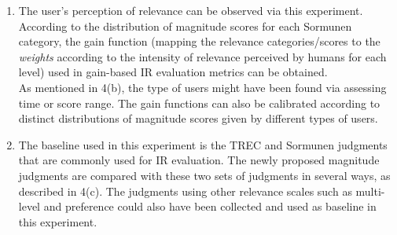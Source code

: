 \documentclass{article}
\begin{document}
\begin{enumerate}
\begin{enumerate}
	\item {The user's perception of relevance can be observed via this experiment. According to the distribution of magnitude scores for each Sormunen category, the gain function (mapping the relevance categories/scores to the \textit{weights} according to the intensity of relevance perceived by humans for each level) used in gain-based IR evaluation metrics can be obtained.\\[0.5em] As mentioned in 4(b), the type of users might have been found via assessing time or score range. The gain functions can also be calibrated according to distinct distributions of magnitude scores given by different types of users.}

	\item The baseline used in this experiment is the TREC and Sormunen judgments that are commonly used for IR evaluation. The newly proposed magnitude judgments are compared with these two sets of judgments in several ways, as described in 4(c). The judgments using other relevance scales such as multi-level and preference could also have been collected and used as baseline in this experiment.


\end{enumerate}
\end{enumerate}
\end{document}
